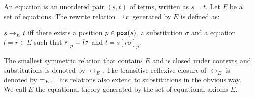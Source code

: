 An equation is an unordered pair $(s,t)$ of terms, written as $s = t$. Let $E$ be a set of equations. The rewrite relation $\rightarrow_E$ generated by $E$ is defined as:
\begin{center}
    $s \rightarrow_E t$ iff there exists a position $p \in \mathtt{pos}(s)$, a substitution $\sigma$ and a equation $l = r \in E$ such that \newline
    $\restr{s}{p} = l \sigma$ and $t = s[r\sigma]_p$.
\end{center}

The smallest symmetric relation that contains $E$ and is closed under contexts and substitutions is denoted by $\leftrightarrow_E$. The transitive-reflexive closure of $\leftrightarrow_E$ is denoted by $\eqUnif{E}$. This relations also extend to substitutions in the obvious way. We call $E$ the equational theory generated by the set of equational axioms $E$.
